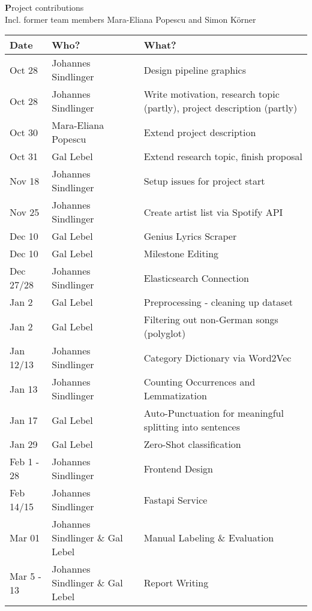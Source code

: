 \thispagestyle{empty}
\newpage
\section*{}
\begin{center}
\large\textbf Project contributions \\
\normalsize Incl. former team members Mara-Eliana Popescu and Simon K{\"o}rner
\end{center}

\vspace*{1cm}

\begin{table}[!ht]
    \centering
    \begin{tabularx}{\textwidth}{|l|p{4cm}|X|}
    \hline
        \textbf{Date} & \textbf{Who?} & \textbf{What?} \\ \hline
        Oct 28 & Johannes Sindlinger & Design pipeline graphics \\ \hline
        Oct 28 & Johannes Sindlinger & Write motivation, research topic (partly), project description (partly) \\ \hline
        Oct 30 & Mara-Eliana Popescu & Extend project description \\ \hline
        Oct 31 & Gal Lebel & Extend research topic, finish proposal \\ \hline
        Nov 18 & Johannes Sindlinger & Setup issues for project start \\ \hline
        Nov 25 & Johannes Sindlinger & Create artist list via Spotify API \\ \hline
        Dec 10 & Gal Lebel & Genius Lyrics Scraper \\ \hline
        Dec 10 & Gal Lebel & Milestone Editing \\ \hline
        Dec 27/28 & Johannes Sindlinger & Elasticsearch Connection \\ \hline
        Jan 2 & Gal Lebel & Preprocessing - cleaning up dataset \\ \hline
        Jan 2 & Gal Lebel & Filtering out non-German songs (polyglot) \\ \hline
        Jan 12/13 & Johannes Sindlinger & Category Dictionary via Word2Vec \\ \hline
        Jan 13 & Johannes Sindlinger & Counting Occurrences and Lemmatization \\ \hline
        Jan 17 & Gal Lebel & Auto-Punctuation for meaningful splitting into sentences \\ \hline
        Jan 29 & Gal Lebel & Zero-Shot classification \\ \hline
        Feb 1 - 28 & Johannes Sindlinger & Frontend Design \\ \hline
        Feb 14/15 & Johannes Sindlinger & Fastapi Service \\ \hline
        Mar 01 & Johannes Sindlinger \& Gal Lebel & Manual Labeling \& Evaluation \\ \hline
        Mar 5 - 13 & Johannes Sindlinger \& Gal Lebel & Report Writing \\ \hline
    \end{tabularx}
\end{table}

